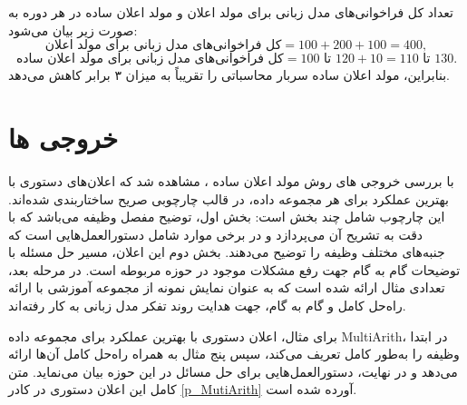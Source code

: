 \noindent تعداد کل فراخوانی‌های مدل زبانی برای مولد اعلان و مولد اعلان ساده در هر دوره به صورت زیر بیان می‌شود:
\[
\text{کل فراخوانی‌های مدل زبانی برای مولد اعلان} = 100 + 200 + 100 = 400,
\]
\[
\text{کل فراخوانی‌های مدل زبانی برای مولد اعلان ساده} = 100 \text{ تا } 120 + 10 = 110 \text{ تا } 130.
\]
بنابراین، مولد اعلان ساده سربار محاسباتی را تقریباً به میزان ۳ برابر کاهش می‌دهد.
    
    
\section{خروجی ها}
با بررسی خروجی های روش مولد اعلان ساده ، مشاهده شد که اعلان‌های دستوری با بهترین عملکرد برای هر مجموعه داده، در قالب چارچوبی صریح ساختاربندی شده‌اند. این چارچوب شامل چند بخش است: بخش اول، توضیح مفصل وظیفه می‌باشد که با دقت به تشریح آن می‌پردازد و در برخی موارد شامل دستورالعمل‌هایی است که جنبه‌های مختلف وظیفه را توضیح می‌دهند. بخش دوم این اعلان، مسیر حل مسئله با توضیحات گام به گام جهت رفع مشکلات موجود در حوزه مربوطه است. در مرحله بعد، تعدادی مثال ارائه شده است که به عنوان نمایش نمونه از مجموعه آموزشی با ارائه راه‌حل کامل و گام به گام، جهت هدایت روند تفکر مدل زبانی به کار رفته‌اند. 

برای مثال، اعلان دستوری با بهترین عملکرد برای مجموعه داده MultiArith، در ابتدا وظیفه را به‌طور کامل تعریف می‌کند، سپس پنج مثال به همراه راه‌حل کامل آن‌ها ارائه می‌دهد و در نهایت، دستورالعمل‌هایی برای حل مسائل در این حوزه بیان می‌نماید. متن کامل این اعلان دستوری در کادر \ref{p_MutiArith} آورده شده است.



